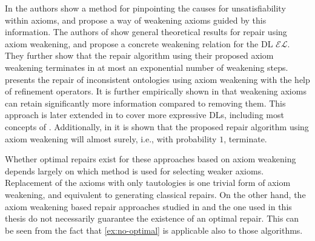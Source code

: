 In \cite{lam2008fine} the authors show a method for pinpointing the causes for unsatisfiability within axioms, and propose a way of weakening axioms guided by this information. The authors of \cite{baader2018making} show general theoretical results for repair using axiom weakening, and propose a concrete weakening relation for the DL $\mathcal{EL}$. They further show that the repair algorithm using their proposed axiom weakening terminates in at most an exponential number of weakening steps. \cite{troquard2018repairing} presents the repair of inconsistent ontologies using axiom weakening with the help of refinement operators. It is further empirically shown in \cite{troquard2018repairing} that weakening axioms can retain significantly more information compared to removing them. This approach is later extended in \cite{confalonieri2020towards} to cover more expressive DLs, including most concepts of \SROIQ. Additionally, in \cite{confalonieri2020towards} it is shown that the proposed repair algorithm using axiom weakening will almost surely, i.e., with probability $1$, terminate.

Whether optimal repairs exist for these approaches based on axiom weakening depends largely on which method is used for selecting weaker axioms. Replacement of the axioms with only tautologies is one trivial form of axiom weakening, and equivalent to generating classical repairs. On the other hand, the axiom weakening based repair approaches studied in \cite{troquard2018repairing,confalonieri2020towards} and the one used in this thesis do not necessarily guarantee the existence of an optimal repair. This can be seen from the fact that \cref{ex:no-optimal} is applicable also to those algorithms.
